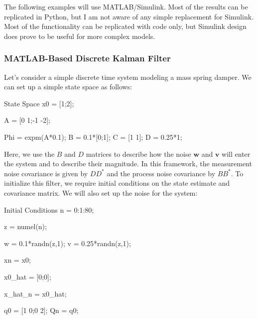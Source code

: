 The following examples will use MATLAB/Simulink. Most of the results can be replicated in Python, but I am not aware of any simple replacement for Simulink. Most of the functionality can be replicated with code only, but Simulink design does prove to be useful for more complex models.

\subsubsection{MATLAB-Based Discrete Kalman Filter}
Let's consider a simple discrete time system modeling a mass spring damper. We can set up a simple state space as follows:
\begin{matlabscript}{State Space}
x0 = [1;2]; %

A = [0 1;-1 -2]; %

Phi = expm(A*0.1); %
B = 0.1*[0;1]; %
C = [1 1]; %
D = 0.25*1; %
\end{matlabscript}

Here, we use the $B$ and $D$ matrices to describe how the noise $\bm{w}$ and $\bm{v}$ will enter the system and to describe their magnitude. In this framework, the measurement noise covariance is given by $DD^*$ and the process noise covariance by $BB^*$. To initialize this filter, we require initial conditions on the state estimate and covariance matrix. We will also set up the noise for the system:
\begin{matlabscript}{Initial Conditions}
n = 0:1:80;

z = numel(n);

w = 0.1*randn(z,1); %
v = 0.25*randn(z,1); %

xn = x0; %

x0_hat = [0;0];

x_hat_n = x0_hat; %

q0 = [1 0;0 2]; %
Qn = q0;   
\end{matlabscript}


